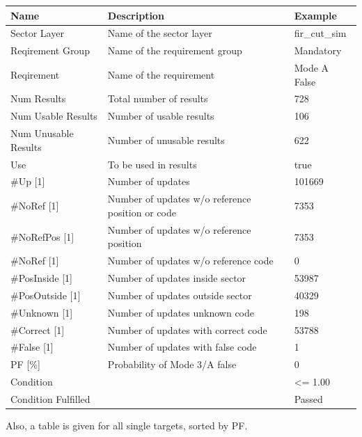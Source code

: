 \begin{center}
 \begin{table}[H]
  \begin{tabularx}{\textwidth}{ | l | X |  l | }
    \hline
    \textbf{Name} & \textbf{Description} & \textbf{Example} \\ \hline
    Sector Layer & Name of the sector layer & fir\_cut\_sim \\ \hline
    Reqirement Group & Name of the requirement group & Mandatory \\ \hline
    Reqirement & Name of the requirement & Mode A False \\ \hline
    Num Results & Total number of results & 728 \\ \hline
    Num Usable Results & Number of usable results & 106 \\ \hline
    Num Unusable Results & Number of unusable results & 622 \\ \hline
    Use & To be used in results & true \\ \hline
    \#Up [1] & Number of updates & 101669 \\ \hline
    \#NoRef [1] & Number of updates w/o reference position or code & 7353 \\ \hline
    \#NoRefPos [1] & Number of updates w/o reference position  & 7353 \\ \hline
    \#NoRef [1] & Number of updates w/o reference code & 0 \\ \hline
    \#PosInside [1] & Number of updates inside sector & 53987 \\ \hline
    \#PosOutside [1] & Number of updates outside sector & 40329 \\ \hline
    \#Unknown [1] & Number of updates unknown code & 198 \\ \hline
    \#Correct [1] & Number of updates with correct code & 53788 \\ \hline
    \#False [1] & Number of updates with false code & 1 \\ \hline
    PF [\%] & Probability of Mode 3/A false & 0 \\ \hline
    Condition &  & <= 1.00 \\ \hline
    Condition Fulfilled &  & Passed \\ \hline
\end{tabularx}
\end{table}
\end{center}

Also, a table is given for all single targets, sorted by PF.

